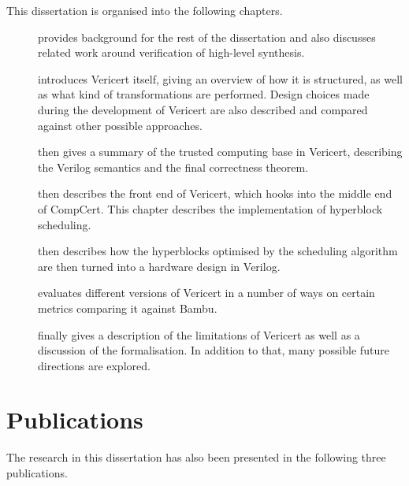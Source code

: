 This dissertation is organised into the following chapters.

\begin{description}
\item[] provides background for the rest of the
  dissertation and also discusses related work around verification of high-level
  synthesis.
\item[] introduces Vericert itself, giving an
  overview of how it is structured, as well as what kind of transformations are
  performed.  Design choices made during the development of Vericert are also
  described and compared against other possible approaches.
\item[] then gives a summary of the trusted
  computing base in Vericert, describing the Verilog semantics and the final
  correctness theorem.
\item[] then describes the front end of
  Vericert, which hooks into the middle end of \gls{CompCert}.  This chapter
  describes the implementation of hyperblock scheduling.
\item[] then describes how the hyperblocks
  optimised by the scheduling algorithm are then turned into a hardware design
  in Verilog.
\item[] evaluates different versions of Vericert in a
  number of ways on certain metrics comparing it against Bambu.
\item[] finally gives a description of the limitations of
  Vericert as well as a discussion of the formalisation.  In addition to that,
  many possible future directions are explored.
\end{description}

\section{Publications}

The research in this dissertation has also been presented in the following three
publications.

